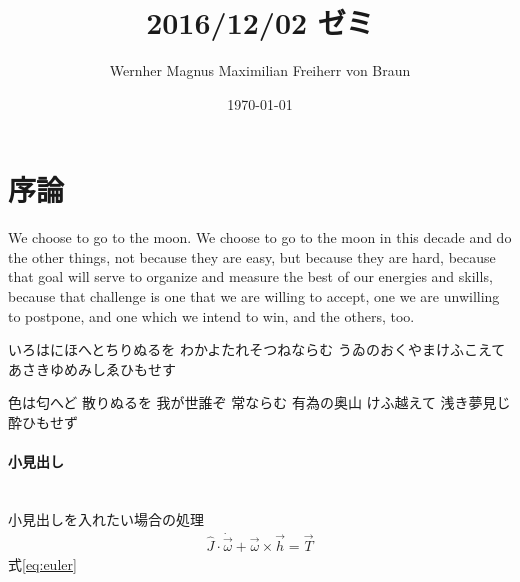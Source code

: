 \documentclass[a4paper,uplatex,dvipdfmx,ja=standard,11pt]{bxjsarticle}
\title{2016/12/02 ゼミ}
\author{Wernher Magnus Maximilian Freiherr von Braun}
\date{\today}
\begin{document}
	\maketitle
	\section{序論}
	We choose to go to the moon. We choose to go to the moon in this decade and do the other things, not because they are easy, but because they are hard, because that goal will serve to organize and measure the best of our energies and skills, because that challenge is one that we are willing to accept, one we are unwilling to postpone, and one which we intend to win, and the others, too.
	
	
	いろはにほへとちりぬるを
	わかよたれそつねならむ
	うゐのおくやまけふこえて
	あさきゆめみしゑひもせす
	
	色は匂へど 散りぬるを
	我が世誰ぞ 常ならむ
	有為の奥山 けふ越えて
	浅き夢見じ 酔ひもせず
	
	\paragraph{小見出し}\leavevmode\\
	\indent
	小見出しを入れたい場合の処理
	\begin{align}
		\hat{J} \cdot \dot{\vec{\omega}} + \vec{\omega}\times \vec{h}  = \vec{T} \label{eq:euler}
	\end{align}
	式\eqref{eq:euler}
	
\end{document}
